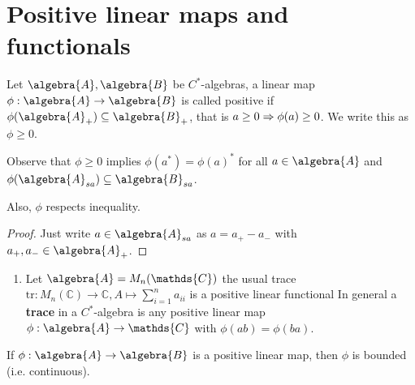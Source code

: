 \documentclass[a4paper]{article}
\begin{document}
\section{Positive linear maps and functionals}



\begin{definition}
	Let $\algebra{A}, \algebra{B}$ be $C^*$-algebras, a linear map $\phi: \algebra{A} \to \algebra{B}$ is called positive if $\phi(\algebra{A}_+) \subseteq \algebra{B}_+$, that is $a \geq 0 \then \phi(a) \geq 0$.
	We write this as $\phi \geq 0$.
\end{definition}


\begin{remark}
	Observe that $\phi \geq 0$ implies $\phi(a^*) = \phi(a)^*$ for all $a \in \algebra{A}$ and $\phi(\algebra{A}_{sa}) \subseteq \algebra{B}_{sa}$.	

	Also, $\phi$ respects inequality.
\end{remark}

\begin{proof}
	Just write $a \in \algebra{A}_{sa}$ as $a = a_+ - a_-$ with $a_+, a_- \in \algebra{A}_+$.
\end{proof}

\begin{example}
	\begin{enumerate}
		\item Let $\algebra{A} = M_n(\mathds{C})$ the usual trace $\mathrm{tr}: M_n(\mathds{C}) \to \mathds{C}, A \mapsto \sum_{i=1}^n a_{ii}$ is a positive linear functional
		In general a \textbf{trace} in a $C^*$-algebra is any positive linear map $\phi: \algebra{A} \to \mathds{C}$ with $\phi(ab) = \phi(ba)$.
	\end{enumerate}
\end{example}

\begin{proposition}
	If $\phi: \algebra{A} \to \algebra{B}$ is a positive linear map, then $\phi$ is bounded (i.e. continuous).
\end{proposition}
\end{document}
